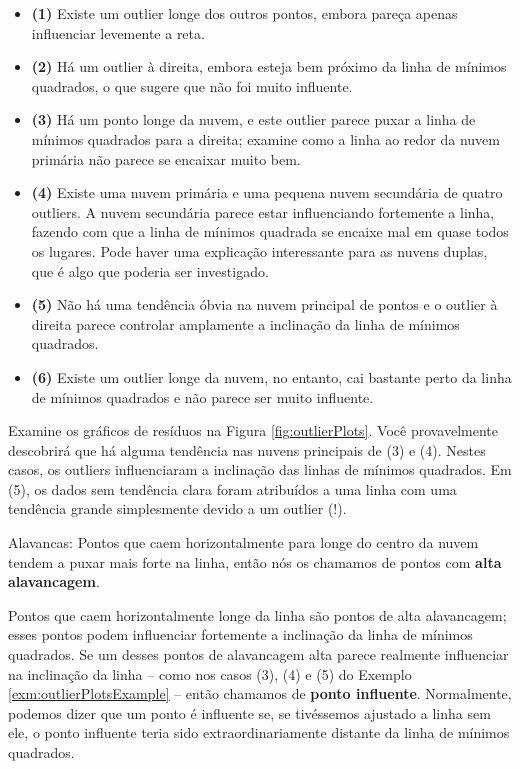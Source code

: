 \documentclass[
]{book}
\theoremstyle{definition}
\theoremstyle{definition}
\theoremstyle{definition}
\theoremstyle{definition}
\theoremstyle{remark}
\begin{document}
\begin{itemize}
\item
  \textbf{(1)} Existe um outlier longe dos outros pontos, embora pareça apenas influenciar levemente a reta.
\item
  \textbf{(2)} Há um outlier à direita, embora esteja bem próximo da linha de mínimos quadrados, o que sugere que não foi muito influente.
\item
  \textbf{(3)} Há um ponto longe da nuvem, e este outlier parece puxar a linha de mínimos quadrados para a direita; examine como a linha ao redor da nuvem primária não parece se encaixar muito bem.
\item
  \textbf{(4)} Existe uma nuvem primária e uma pequena nuvem secundária de quatro outliers. A nuvem secundária parece estar influenciando fortemente a linha, fazendo com que a linha de mínimos quadrada se encaixe mal em quase todos os lugares. Pode haver uma explicação interessante para as nuvens duplas, que é algo que poderia ser investigado.
\item
  \textbf{(5)} Não há uma tendência óbvia na nuvem principal de pontos e o outlier à direita parece controlar amplamente a inclinação da linha de mínimos quadrados.
\item
  \textbf{(6)} Existe um outlier longe da nuvem, no entanto, cai bastante perto da linha de mínimos quadrados e não parece ser muito influente.
\end{itemize}

Examine os gráficos de resíduos na Figura \ref{fig:outlierPlots}. Você provavelmente descobrirá que há alguma tendência nas nuvens principais de (3) e (4). Nestes casos, os outliers influenciaram a inclinação das linhas de mínimos quadrados. Em (5), os dados sem tendência clara foram atribuídos a uma linha com uma tendência grande simplesmente devido a um outlier (!).

Alavancas: Pontos que caem horizontalmente para longe do centro da nuvem tendem a puxar mais forte na linha, então nós os chamamos de pontos com \textbf{alta alavancagem}.

Pontos que caem horizontalmente longe da linha são pontos de alta alavancagem; esses pontos podem influenciar fortemente a inclinação da linha de mínimos quadrados. Se um desses pontos de alavancagem alta parece realmente influenciar na inclinação da linha -- como nos casos (3), (4) e (5) do Exemplo \ref{exm:outlierPlotsExample} -- então chamamos de \textbf{ponto influente}. Normalmente, podemos dizer que um ponto é influente se, se tivéssemos ajustado a linha sem ele, o ponto influente teria sido extraordinariamente distante da linha de mínimos quadrados.
\end{document}
